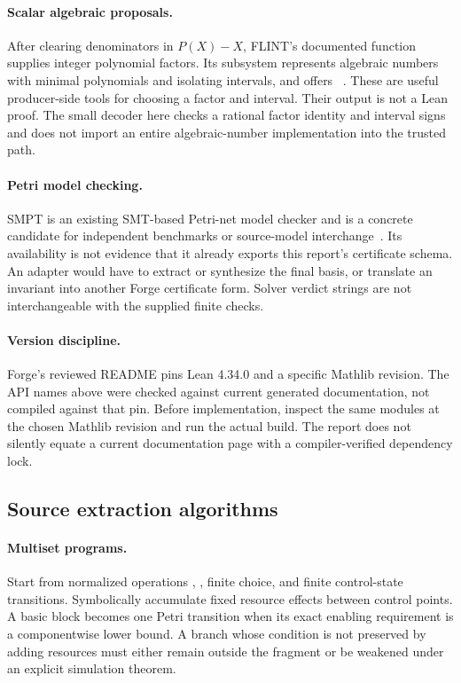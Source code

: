 \paragraph{Scalar algebraic proposals.}
After clearing denominators in $P(X)-X$, FLINT's documented  function supplies integer polynomial factors. Its  subsystem represents algebraic numbers with minimal polynomials and isolating intervals, and offers ~\cite{flint-factor,flint-qqbar}. These are useful producer-side tools for choosing a factor and interval. Their output is not a Lean proof. The small decoder here checks a rational factor identity and interval signs and does not import an entire algebraic-number implementation into the trusted path.

\paragraph{Petri model checking.}
SMPT is an existing SMT-based Petri-net model checker and is a concrete candidate for independent benchmarks or source-model interchange~\cite{smpt}. Its availability is not evidence that it already exports this report's certificate schema. An adapter would have to extract or synthesize the final basis, or translate an invariant into another Forge certificate form. Solver verdict strings are not interchangeable with the supplied finite checks.

\paragraph{Version discipline.}
Forge's reviewed README pins Lean 4.34.0 and a specific Mathlib revision. The API names above were checked against current generated documentation, not compiled against that pin. Before implementation, inspect the same modules at the chosen Mathlib revision and run the actual build. The report does not silently equate a current documentation page with a compiler-verified dependency lock.

\subsection{Source extraction algorithms}
\paragraph{Multiset programs.}
Start from normalized operations , , finite choice, and finite control-state transitions. Symbolically accumulate fixed resource effects between control points. A basic block becomes one Petri transition when its exact enabling requirement is a componentwise lower bound. A branch whose condition is not preserved by adding resources must either remain outside the fragment or be weakened under an explicit simulation theorem.

